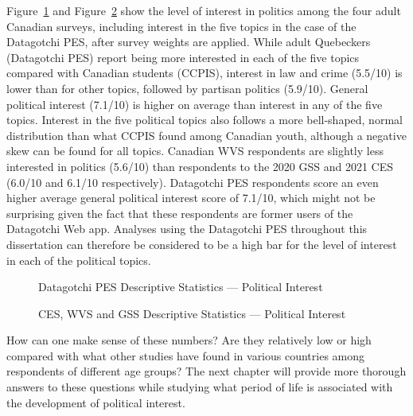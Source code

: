 \documentclass[
  letterpaper,
  DIV=11,
  numbers=noendperiod]{scrreprt}
\begin{document}
Figure~\ref{fig-dginterest} and Figure~\ref{fig-ceswvsgssinterest} show
the level of interest in politics among the four adult Canadian surveys,
including interest in the five topics in the case of the Datagotchi PES,
after survey weights are applied. While adult Quebeckers (Datagotchi
PES) report being more interested in each of the five topics compared
with Canadian students (CCPIS), interest in law and crime (5.5/10) is
lower than for other topics, followed by partisan politics (5.9/10).
General political interest (7.1/10) is higher on average than interest
in any of the five topics. Interest in the five political topics also
follows a more bell-shaped, normal distribution than what CCPIS found
among Canadian youth, although a negative skew can be found for all
topics. Canadian WVS respondents are slightly less interested in
politics (5.6/10) than respondents to the 2020 GSS and 2021 CES (6.0/10
and 6.1/10 respectively). Datagotchi PES respondents score an even
higher average general political interest score of 7.1/10, which might
not be surprising given the fact that these respondents are former users
of the Datagotchi Web app. Analyses using the Datagotchi PES throughout
this dissertation can therefore be considered to be a high bar for the
level of interest in each of the political topics.

\begin{figure}


\caption{\label{fig-dginterest}Datagotchi PES Descriptive Statistics ---
Political Interest}

\end{figure}%

\begin{figure}


\caption{\label{fig-ceswvsgssinterest}CES, WVS and GSS Descriptive
Statistics --- Political Interest}

\end{figure}%

How can one make sense of these numbers? Are they relatively low or high
compared with what other studies have found in various countries among
respondents of different age groups? The next chapter will provide more
thorough answers to these questions while studying what period of life
is associated with the development of political interest.
\end{document}
